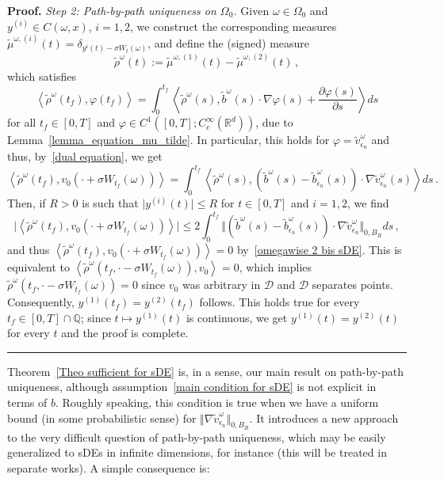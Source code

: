 \documentclass[a4paper,10pt]{article}
\newenvironment{proof}[1][Proof]{\noindent\textbf{#1.} }{\ \rule{0.5em}{0.5em}}
\begin{document}
\begin{proof}
\emph{Step 2: Path-by-path uniqueness on $\Omega_{0}$.} 
Given $\omega\in \Omega_0$ and $y^{(i)}\in C(\omega,x)$, $i=1,2$, we construct the corresponding measures $\widetilde{\mu}^{\omega,(i)}(t) = \delta_{y^i(t) - \sigma W_t(\omega)}$, and define the (signed) measure
\[
\widetilde{\rho}^\omega(t)  :=\widetilde{\mu}^{\omega,(1)}(t)  -\widetilde{\mu}^{\omega,(2)}(t)  \,,
\]
which satisfies
\[
\left\langle \widetilde{\rho}^\omega(t_{f})  ,\varphi(
t_{f})  \right\rangle =\int_{0}^{t_{f}}\left\langle \widetilde{\rho
}^\omega(s)  ,\widetilde{b}^\omega(s)
\cdot\nabla\varphi(s)  +\frac{\partial\varphi(s)
}{\partial s}\right\rangle ds
\]
for all $t_{f}\in [0,T]$ and $\varphi\in C^{1}([0,T];C_{c}^{\infty}(\mathbb{R}^{d}))$, due to Lemma~\ref{lemma_equation_mu_tilde}. In particular, this
holds for $\varphi=\widetilde{v}_{\epsilon_{n}}^\omega $ and
thus, by~\eqref{dual equation}, we get 
\[
\left\langle \widetilde{\rho}^\omega(t_{f})  ,v_{0} (\cdot+\sigma W_{t_{f}}(\omega))  \right\rangle =\int_{0}^{t_{f}}\left\langle \widetilde{\rho}^\omega(s) ,(
\widetilde{b}^\omega(s)  -\widetilde{b}_{\epsilon_{n}}^\omega(s) )  \cdot\nabla\widetilde{v}_{\epsilon_{n}}^\omega(s)  \right\rangle ds \,.
\]
Then, if $R>0$ is such that $\vert y^{(i)}(t)\vert \leq R$ for $t\in [0,T]$ and $i=1,2$, we find
\[
\big\vert \left\langle \widetilde{\rho}^\omega(t_{f})
,v_{0} (\cdot+\sigma W_{t_{f}}(\omega))
\right\rangle \big\vert \leq2\int_{0}^{t_{f}} \big\Vert (
\widetilde{b}^\omega(s)  -\widetilde{b}_{\epsilon_{n}}^\omega(s) )  \cdot\nabla\widetilde{v}_{\epsilon_{n}}^\omega  \big\Vert _{0,B_R}ds \,,
\]
and thus $\left\langle \widetilde{\rho}^\omega(t_{f}),v_{0}(\cdot+\sigma W_{t_{f}}(  \omega)  )\right\rangle =0$ by~\eqref{omegawise 2 bis sDE}. This is equivalent to
$\left\langle \widetilde{\rho}^\omega (t_{f},\cdot-\sigma W_{t_{f}}(\omega))  ,v_{0}\right\rangle =0$, which implies
$\widetilde{\rho}^\omega(t_{f},\cdot-\sigma W_{t_{f}}(\omega))  =0$ since $v_0$ was arbitrary in $\mathcal{D}$ and $\mathcal{D}$ separates points. Consequently, $y^{(1)}(t_{f})  =y^{(2)}(t_{f})$ follows. This holds true for every $t_{f}\in [0,T] \cap\mathbb{Q}$; since $t\mapsto y^{(1)}(t)$ is
continuous, we get $y^{(1)}(t) =y^{(2)}(t)$ for every $t$ and the proof is complete.
\end{proof}

Theorem~\ref{Theo sufficient for sDE} is, in a sense, our main result on
path-by-path uniqueness, although assumption~\eqref{main condition for sDE} is not 
explicit in terms of $b$. Roughly speaking, this condition is
true when we have a uniform bound (in some probabilistic sense) for
$\Vert \nabla\widetilde{v}_{\epsilon_{n}}^\omega \Vert_{0,B_R}$. 
It introduces a new approach
to the very difficult question of path-by-path uniqueness, which may be easily
generalized to sDEs in infinite dimensions, for instance (this will be treated
in separate works). A simple consequence is:
\end{document}

